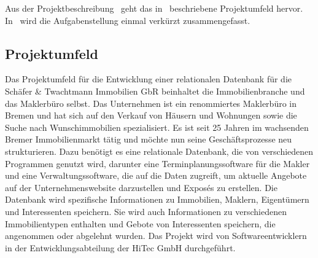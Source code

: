 
Aus der Projektbeschreibung~\cite*{Auftrag} geht das in~ beschriebene Projektumfeld hervor.
In~ wird die Aufgabenstellung einmal verkürzt zusammengefasst.

\subsection{Projektumfeld}
\label{subsec:projektumfeld}
Das Projektumfeld für die Entwicklung einer relationalen Datenbank für die Schäfer \& Twachtmann Immobilien GbR beinhaltet die Immobilienbranche und das Maklerbüro selbst.
Das Unternehmen ist ein renommiertes Maklerbüro in Bremen und hat sich auf den Verkauf von Häusern und Wohnungen sowie die Suche nach Wunschimmobilien spezialisiert.
Es ist seit 25 Jahren im wachsenden Bremer Immobilienmarkt tätig und möchte nun seine Geschäftsprozesse neu strukturieren.
Dazu benötigt es eine relationale Datenbank, die von verschiedenen Programmen genutzt wird, darunter eine Terminplanungssoftware für die Makler und eine Verwaltungssoftware, die auf die Daten zugreift, um aktuelle Angebote auf der Unternehmenswebsite darzustellen und Exposés zu erstellen.
Die Datenbank wird spezifische Informationen zu Immobilien, Maklern, Eigentümern und Interessenten speichern.
Sie wird auch Informationen zu verschiedenen Immobilientypen enthalten und Gebote von Interessenten speichern, die angenommen oder abgelehnt wurden.
Das Projekt wird von Softwareentwicklern in der Entwicklungsabteilung der HiTec GmbH durchgeführt.

